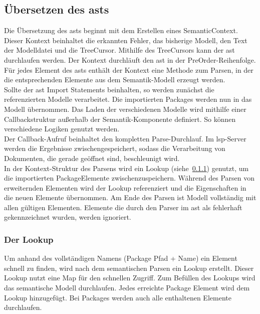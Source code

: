 \documentclass[./einleitung.tex]{subfiles}
\begin{document}
    \subsection{Übersetzen des \acrshort{ast}s}\label{subsec:ubersetzen-des-asts}
    Die Übersetzung des \acrshort{ast}s beginnt mit dem Erstellen eines SemanticContext.
    Dieser Kontext beinhaltet die erkannten Fehler, das bisherige Modell, den Text der Modelldatei und die TreeCursor.
    Mithilfe des TreeCursors kann der \acrshort{ast} durchlaufen werden.
    Der Kontext durchläuft den \acrshort{ast} in der PreOrder-Reihenfolge.
    Für jedes Element des \acrshort{ast}s enthält der Kontext eine Methode zum Parsen, in der die entsprechenden Elemente aus dem Semantik-Modell erzeugt werden.\\
    Sollte der \acrshort{ast} Import Statements beinhalten, so werden zunächst die referenzierten Modelle verarbeitet.
    Die importierten Packages werden nun in das Modell übernommen.
    Das Laden der verschiedenen Modelle wird mithilfe einer Callbackstruktur außerhalb der Semantik-Komponente definiert.
    So können verschiedene Logiken genutzt werden. \\
    Der Callback-Aufruf beinhaltet den kompletten Parse-Durchlauf.
    Im \acrshort{lsp}-Server werden die Ergebnisse zwischengespeichert, sodass die Verarbeitung von Dokumenten, die gerade geöffnet sind, beschleunigt wird.\\
    In der Kontext-Struktur des Parsens wird ein Lookup (siehe~\ref{subsubsec:lookup}) genutzt, um die importierten PackageElemente zwischenzuspeichern.
    Während des Parsen von erweiternden Elementen wird der Lookup referenziert und die Eigenschaften in die neuen Elemente übernommen.
    Am Ende des Parsen ist Modell vollständig mit allen gültigen Elementen.
    Elemente die durch den Parser im \acrshort{ast} als fehlerhaft gekennzeichnet wurden, werden ignoriert.

    \subsubsection{Der Lookup}\label{subsubsec:lookup}
    Um anhand des vollständigen Namens (Package Pfad + Name) ein Element schnell zu finden, wird nach dem semantischen Parsen ein Lookup erstellt.
    Dieser Lookup nutzt eine Map für den schnellen Zugriff.
    Zum Befüllen des Lookups wird das semantische Modell durchlaufen.
    Jedes erreichte Package Element wird dem Lookup hinzugefügt.
    Bei Packages werden auch alle enthaltenen Elemente durchlaufen.
\end{document}
